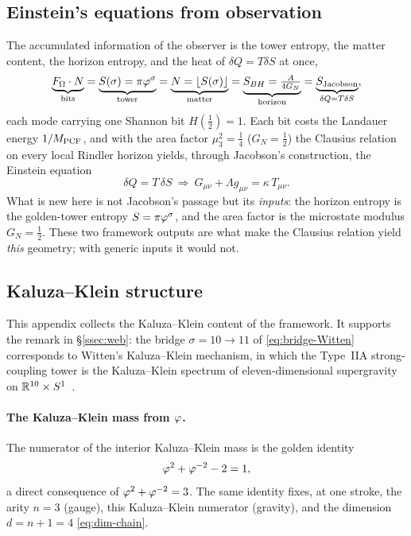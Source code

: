 \subsection{Einstein's equations from observation}\label{app:einstein}
The accumulated information of the observer is the tower entropy, the matter content, the horizon entropy, and
the heat of $\delta Q=T\delta S$ at once,
\begin{equation}
  \underbrace{F_\Omega\cdot N}_{\text{bits}}
   =\underbrace{S(\sigma)=\pi\varphi^{\sigma}}_{\text{tower}}
   =\underbrace{N=\lfloor S(\sigma)\rfloor}_{\text{matter}}
   =\underbrace{S_{BH}=\tfrac{A}{4G_N}}_{\text{horizon}}
   =\underbrace{S_{\text{Jacobson}}}_{\delta Q=T\delta S},
\end{equation}
each mode carrying one Shannon bit $H(\tfrac12)=1$. Each bit costs the Landauer energy $1/M_{\mathrm{PCF}}$, and with the
area factor $\mu_3^{2}=\tfrac14$ ($G_N=\tfrac12$) the Clausius relation on every local Rindler horizon yields,
through Jacobson's construction, the Einstein equation
\begin{equation}
  \delta Q=T\,\delta S\ \Longrightarrow\ G_{\mu\nu}+\Lambda g_{\mu\nu}=\kappa\,T_{\mu\nu} .
\end{equation}
What is new here is not Jacobson's passage but its \emph{inputs}: the horizon entropy is the golden-tower
entropy $S=\pi\varphi^{\sigma}$, and the area factor is the microstate modulus $G_N=\tfrac12$. These two
framework outputs are what make the Clausius relation yield \emph{this} geometry; with generic inputs it would
not.

\subsection{Kaluza--Klein structure}\label{app:kk}
This appendix collects the Kaluza--Klein content of the framework. It supports the remark in
\S\ref{ssec:web}: the bridge $\sigma=10\to11$ of \eqref{eq:bridge-Witten} corresponds to Witten's
Kaluza--Klein mechanism, in which the Type~IIA strong-coupling tower is the Kaluza--Klein spectrum of
eleven-dimensional supergravity on $\mathbb{R}^{10}\times S^1$~\cite{Witten95}.

\paragraph{The Kaluza--Klein mass from $\varphi$.}
The numerator of the interior Kaluza--Klein mass is the golden identity
\begin{equation}\label{eq:kk-numerator}
  \varphi^{2}+\varphi^{-2}-2=1 ,
\end{equation}
a direct consequence of $\varphi^{2}+\varphi^{-2}=3$. The same identity fixes, at one stroke, the arity
$n=3$ (gauge), this Kaluza--Klein numerator (gravity), and the dimension $d=n+1=4$
\eqref{eq:dim-chain}.

